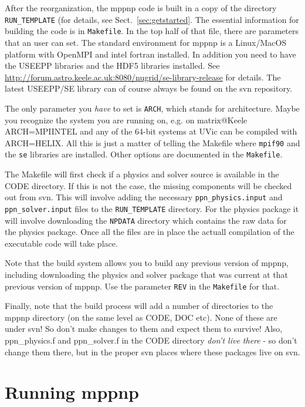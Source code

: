 After the reorganization, the mppnp code is built in a copy of
the directory \texttt{RUN\_TEMPLATE} (for details, see Sect.\ \ref{sec:getstarted}. 
The essential information for building the code is in \texttt{Makefile}. In the top
half of that file, there are parameters that an user can set. The standard
environment for mppnp is a Linux/MacOS platform with OpenMPI and intel
fortran installed. In addition you need to have the USEEPP libraries
and the HDF5 libraries installed. See
\url{http://forum.astro.keele.ac.uk:8080/nugrid/se-library-release}
for details. The latest USEEPP/SE library can of course always be
found on the svn repository.

The only parameter you \emph{have} to set is \texttt{ARCH}, which
stands for architecture. Maybe you recognize the system you are
running on, e.g. on matrix@Keele ARCH=MPIINTEL and any of the 64-bit
systems at UVic can be compiled with ARCH=HELIX. All this is just a
matter of telling the Makefile where \texttt{mpif90} and the
\texttt{se} libraries are installed. Other options are documented in
the \texttt{Makefile}.

The Makefile will first check if a physics and solver source is
available in the CODE directory. If this is not the case, the missing
components will be checked out from svn. This will involve adding the
necessary \texttt{ppn\_physics.input} and \texttt{ppn\_solver.input}
files to the \texttt{RUN\_TEMPLATE} directory. For the physics package
it will involve downloading the \texttt{NPDATA} directory which
contains the raw data for the physics package. Once all the files are
in place the actuall compilation of the executable code will take
place.

Note that the build system allows you to build any previous version of
mppnp, including downloading the physics and solver package that was
current at that previous version of mppnp. Use the parameter
\texttt{REV} in the \texttt{Makefile} for that.

Finally, note that the build process will add a number of directories
to the mppnp directory (on the same level as CODE, DOC etc). None of
these are under svn! So don't make changes to them and expect them to
survive! Also, ppn\_physics.f and ppn\_solver.f in the CODE directory
\emph{don't live there} - so don't change them there, but in the
proper svn places where these packages live on svn.



\section{Running mppnp}
\label{sec:running}

